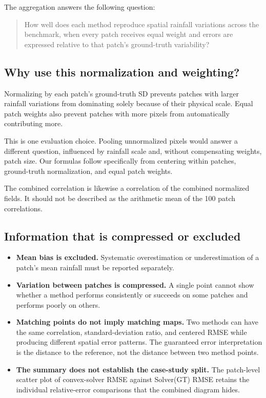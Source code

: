 \documentclass[11pt,a4paper]{article}
\begin{document}
The aggregation answers the following question:
\begin{quote}
How well does each method reproduce spatial rainfall variations across the benchmark, when every patch receives equal weight and errors are expressed relative to that patch's ground-truth variability?
\end{quote}

\subsection*{Why use this normalization and weighting?}
Normalizing by each patch's ground-truth SD prevents patches with larger rainfall variations from dominating solely because of their physical scale. Equal patch weights also prevent patches with more pixels from automatically contributing more.

This is one evaluation choice. Pooling unnormalized pixels would answer a different question, influenced by rainfall scale and, without compensating weights, patch size. Our formulas follow specifically from centering within patches, ground-truth normalization, and equal patch weights.

The combined correlation is likewise a correlation of the combined normalized fields. It should not be described as the arithmetic mean of the 100 patch correlations.

\subsection*{Information that is compressed or excluded}
\begin{itemize}
\item \textbf{Mean bias is excluded.} Systematic overestimation or underestimation of a patch's mean rainfall must be reported separately.
\item \textbf{Variation between patches is compressed.} A single point cannot show whether a method performs consistently or succeeds on some patches and performs poorly on others.
\item \textbf{Matching points do not imply matching maps.} Two methods can have the same correlation, standard-deviation ratio, and centered RMSE while producing different spatial error patterns. The guaranteed error interpretation is the distance to the reference, not the distance between two method points.
\item \textbf{The summary does not establish the case-study split.} The patch-level scatter plot of convex-solver RMSE against Solver(GT) RMSE retains the individual relative-error comparisons that the combined diagram hides.
\end{itemize}
\end{document}
